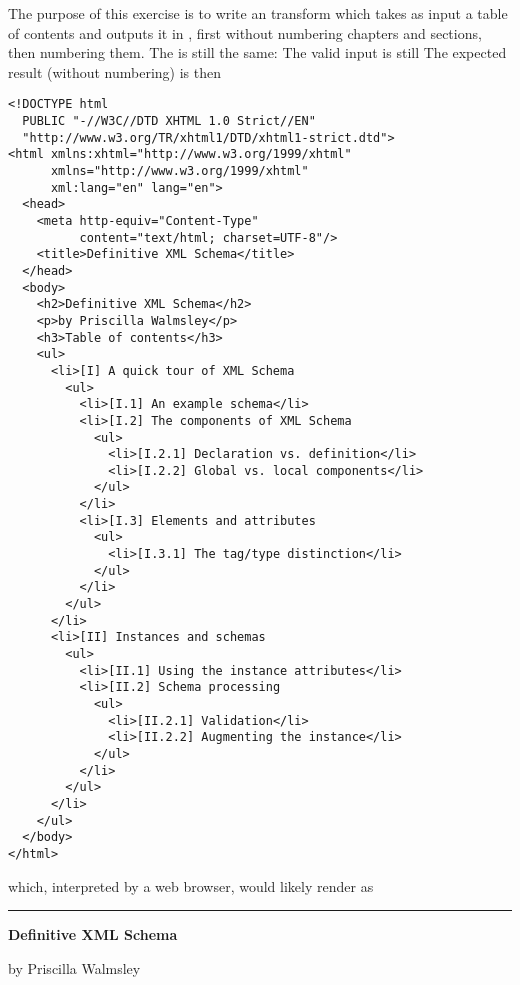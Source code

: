 The purpose of this exercise is to write an \XSLT transform which
takes as input a table of contents and outputs it in \XHTML, first
without numbering chapters and sections, then numbering them. The \DTD
is still the same:
\noindent The valid input is still
\noindent The expected result (without numbering) is then
\begin{verbatim}
<!DOCTYPE html
  PUBLIC "-//W3C//DTD XHTML 1.0 Strict//EN" 
  "http://www.w3.org/TR/xhtml1/DTD/xhtml1-strict.dtd">
<html xmlns:xhtml="http://www.w3.org/1999/xhtml" 
      xmlns="http://www.w3.org/1999/xhtml"
      xml:lang="en" lang="en">
  <head>
    <meta http-equiv="Content-Type"
          content="text/html; charset=UTF-8"/>
    <title>Definitive XML Schema</title>
  </head>
  <body>
    <h2>Definitive XML Schema</h2>
    <p>by Priscilla Walmsley</p>
    <h3>Table of contents</h3>
    <ul>
      <li>[I] A quick tour of XML Schema
        <ul>
          <li>[I.1] An example schema</li>
          <li>[I.2] The components of XML Schema
            <ul>
              <li>[I.2.1] Declaration vs. definition</li>
              <li>[I.2.2] Global vs. local components</li>
            </ul>
          </li>
          <li>[I.3] Elements and attributes
            <ul>
              <li>[I.3.1] The tag/type distinction</li>
            </ul>
          </li>
        </ul>
      </li>
      <li>[II] Instances and schemas
        <ul>
          <li>[II.1] Using the instance attributes</li>
          <li>[II.2] Schema processing
            <ul>
              <li>[II.2.1] Validation</li>
              <li>[II.2.2] Augmenting the instance</li>
            </ul>
          </li>
        </ul>
      </li>
    </ul>
  </body>
</html>
\end{verbatim}
which, interpreted by a web browser, would likely render as

\noindent\rule{\linewidth}{0.5pt}
\noindent\textbf{\large Definitive XML Schema}

\bigskip

\noindent by Priscilla Walmsley

\bigskip

